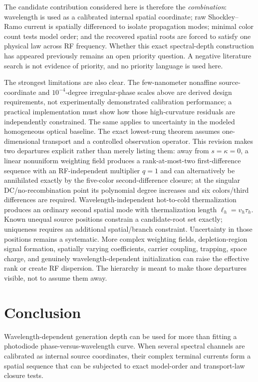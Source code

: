 \documentclass[11pt]{article}
\begin{document}
The candidate contribution considered here is therefore the \emph{combination}: wavelength is used as a calibrated internal spatial coordinate; raw Shockley--Ramo current is spatially differenced to isolate propagation modes; minimal color count tests model order; and the recovered spatial roots are forced to satisfy one physical law across RF frequency. Whether this exact spectral-depth construction has appeared previously remains an open priority question. A negative literature search is not evidence of priority, and no priority language is used here.

The strongest limitations are also clear. The few-nanometer nonaffine source-coordinate and $10^{-4}$-degree irregular-phase scales above are derived design requirements, not experimentally demonstrated calibration performance; a practical implementation must show how those high-curvature residuals are independently constrained. The same applies to uncertainty in the modeled homogeneous optical baseline.  The exact lowest-rung theorem assumes one-dimensional transport and a controlled observation operator. This revision makes two departures explicit rather than merely listing them: away from $s=\kappa=0$, a linear nonuniform weighting field produces a rank-at-most-two first-difference sequence with an RF-independent multiplier $q=1$ and can alternatively be annihilated exactly by the five-color second-difference closure; at the singular DC/no-recombination point its polynomial degree increases and six colors/third differences are required. Wavelength-independent hot-to-cold thermalization produces an ordinary second spatial mode with thermalization length $\ell_h=v_h\tau_h$. Known unequal source positions constrain a candidate-root set exactly; uniqueness requires an additional spatial/branch constraint. Uncertainty in those positions remains a systematic. More complex weighting fields, depletion-region signal formation, spatially varying coefficients, carrier coupling, trapping, space charge, and genuinely wavelength-dependent initialization can raise the effective rank or create RF dispersion. The hierarchy is meant to make those departures visible, not to assume them away.

\section{Conclusion}

Wavelength-dependent generation depth can be used for more than fitting a photodiode phase-versus-wavelength curve. When several spectral channels are calibrated as internal source coordinates, their complex terminal currents form a spatial sequence that can be subjected to exact model-order and transport-law closure tests.
\end{document}
